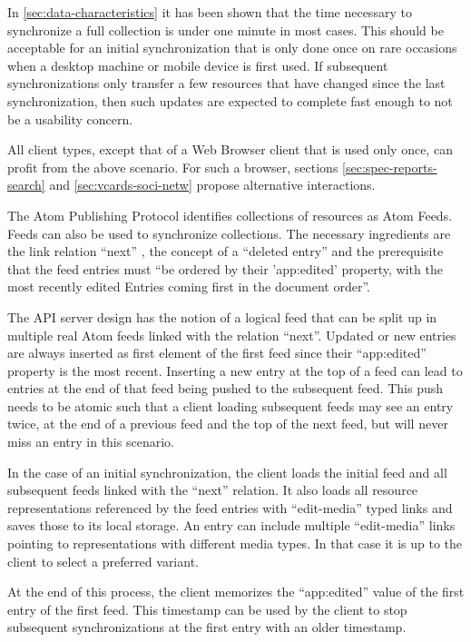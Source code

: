 \documentclass[11pt,a4paper,headsepline,twoside]{scrartcl}		%
\begin{document}
In \autoref{sec:data-characteristics} it has been shown that the time necessary
to synchronize a full collection is under one minute in most cases. This should
be acceptable for an initial synchronization that is only done once on rare
occasions when a desktop machine or mobile device is first used. If subsequent
synchronizations only transfer a few resources that have changed since the last
synchronization, then such updates are expected to complete fast enough to not
be a usability concern.

All client types, except that of a Web Browser client that is used only once,
can profit from the above scenario. For such a browser, sections
\ref{sec:spec-reports-search} and \ref{sec:vcards-soci-netw} propose alternative
interactions.

The Atom Publishing Protocol identifies collections of resources as Atom
Feeds. Feeds can also be used to synchronize collections. The necessary
ingredients are the link relation ``next'' \cite{RFC5005}, the concept of a
``deleted entry'' \cite{draft-snell-atompub-tombstones-14} and the prerequisite
that the feed entries must ``be ordered by their 'app:edited' property, with the
most recently edited Entries coming first in the document
order''\cite[sec. 10]{RFC5023}.

The API server design has the notion of a logical feed that can be split up in
multiple real Atom feeds linked with the relation ``next''. Updated or new
entries are always inserted as first element of the first feed since their
``app:edited'' property is the most recent. Inserting a new entry at the top of
a feed can lead to entries at the end of that feed being pushed to the
subsequent feed. This push needs to be atomic such that a client loading
subsequent feeds may see an entry twice, at the end of a previous feed and the
top of the next feed, but will never miss an entry in this scenario.

In the case of an initial synchronization, the client loads the initial feed and
all subsequent feeds linked with the ``next'' relation. It also loads all
resource representations referenced by the feed entries with ``edit-media''
typed links and saves those to its local storage. An entry can include multiple
``edit-media'' links pointing to representations with different media types. In
that case it is up to the client to select a preferred variant.

At the end of this process, the client memorizes the ``app:edited'' value of the
first entry of the first feed. This timestamp can be used by the client to stop
subsequent synchronizations at the first entry with an older timestamp.
\end{document}
